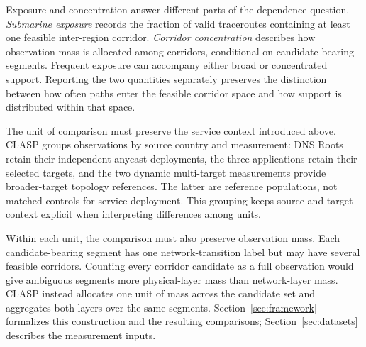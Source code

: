 Exposure and concentration answer different parts of the dependence
question. \emph{Submarine exposure} records the fraction of valid
traceroutes containing at least one feasible inter-region corridor.
\emph{Corridor concentration} describes how observation mass is allocated
among corridors, conditional on candidate-bearing segments. Frequent
exposure can accompany either broad or concentrated support. Reporting
the two quantities separately preserves the distinction between how often
paths enter the feasible corridor space and how support is distributed
within that space.

The unit of comparison must preserve the service context introduced
above. CLASP groups observations by source country and measurement:
DNS Roots retain their independent anycast deployments, the three
applications retain their selected targets, and the two dynamic multi-target
measurements provide broader-target topology references. The latter are
reference populations, not matched controls for service deployment.
This grouping keeps source and target context explicit when interpreting
differences among units.

Within each unit, the comparison must also preserve observation mass.
Each candidate-bearing segment has one network-transition label but may
have several feasible corridors. Counting every corridor candidate as a
full observation would give ambiguous segments more physical-layer mass
than network-layer mass. CLASP instead allocates one unit of mass across
the candidate set and aggregates both layers over the same segments.
Section~\ref{sec:framework} formalizes this construction and the resulting
comparisons; Section~\ref{sec:datasets} describes the measurement inputs.
